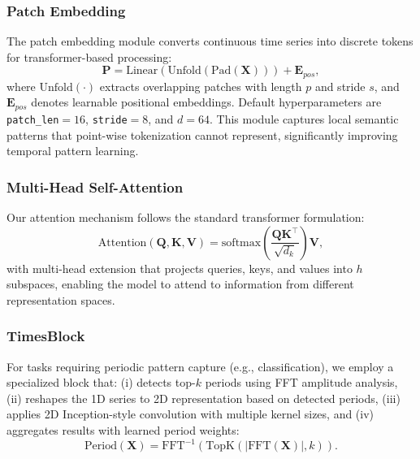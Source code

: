 \subsubsection{Patch Embedding}
\label{appx:embedding}
The patch embedding module converts continuous time series into discrete tokens for transformer-based processing:
\begin{equation}
    \mathbf{P} = \text{Linear}(\text{Unfold}(\text{Pad}(\mathbf{X}))) + \mathbf{E}_{pos},
\end{equation}
where $\text{Unfold}(\cdot)$ extracts overlapping patches with length $p$ and stride $s$, and $\mathbf{E}_{pos}$ denotes learnable positional embeddings. Default hyperparameters are \texttt{patch\_len}$=16$, \texttt{stride}$=8$, and $d=64$. This module captures local semantic patterns that point-wise tokenization cannot represent, significantly improving temporal pattern learning.

\subsubsection{Multi-Head Self-Attention}
\label{appx:mhsa}
Our attention mechanism follows the standard transformer formulation:
\begin{equation}
    \text{Attention}(\mathbf{Q}, \mathbf{K}, \mathbf{V}) = \text{softmax}\left(\frac{\mathbf{Q}\mathbf{K}^\top}{\sqrt{d_k}}\right)\mathbf{V},
\end{equation}
with multi-head extension that projects queries, keys, and values into $h$ subspaces, enabling the model to attend to information from different representation spaces.

\subsubsection{TimesBlock}
\label{appx:timesblock}
For tasks requiring periodic pattern capture (e.g., classification), we employ a specialized block that: (i) detects top-$k$ periods using FFT amplitude analysis, (ii) reshapes the 1D series to 2D representation based on detected periods, (iii) applies 2D Inception-style convolution with multiple kernel sizes, and (iv) aggregates results with learned period weights:
\begin{equation}
    \text{Period}(\mathbf{X}) = \text{FFT}^{-1}\left(\text{TopK}\left(|\text{FFT}(\mathbf{X})|, k\right)\right).
\end{equation}

